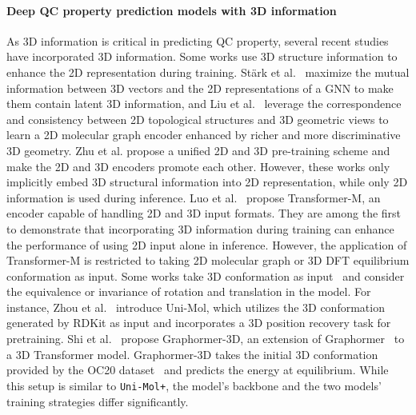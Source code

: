 \documentclass{article}
\newcommand{\name}{\texttt{Uni-Mol+}\xspace}
\begin{document}
\paragraph{Deep QC property prediction models with 3D information}
As 3D information is critical in predicting QC property, several recent studies have incorporated 3D information.
Some works use 3D structure information to enhance the 2D representation during training. St{\"a}rk et al.~\cite{stark20223d} maximize the mutual information between 3D vectors and the 2D representations of a GNN to make them contain latent 3D information, and Liu et al.~\cite{liu2021pre} leverage the correspondence and consistency between 2D topological structures and 3D geometric views to learn a 2D molecular graph encoder enhanced by richer and more discriminative 3D geometry. Zhu et al. propose a unified 2D and 3D pre-training scheme and make the 2D and 3D encoders promote each other. However, these works only implicitly embed 3D structural information into 2D representation, while only 2D information is used during inference. 
Luo et al.~\cite{luo2022one} propose Transformer-M, an encoder capable of handling 2D and 3D input formats. They are among the first to demonstrate that incorporating 3D information during training can enhance the performance of using 2D input alone in inference. However, the application of Transformer-M is restricted to taking 2D molecular graph or 3D DFT equilibrium conformation as input.
Some works take 3D conformation as input~\cite{schutt2017schnet, klicpera2003directional, hutchinson2021lietransformer, tholke2022equivariant, shi2022benchmarking, ying2021transformers, zhou2022uni} and consider the equivalence or invariance of rotation and translation in the model. 
For instance, Zhou et al.~\cite{zhou2022uni} introduce Uni-Mol, which utilizes the 3D conformation generated by RDKit as input and incorporates a 3D position recovery task for pretraining. Shi et al.~\cite{shi2022benchmarking} propose Graphormer-3D, an extension of Graphormer~\cite{ying2021transformers} to a 3D Transformer model. Graphormer-3D takes the initial 3D conformation provided by the OC20 dataset~\cite{chanussot2021open} and predicts the energy at equilibrium. While this setup is similar to \name, the model's backbone and the two models' training strategies differ significantly. 

\vspace{-6pt}
\end{document}
